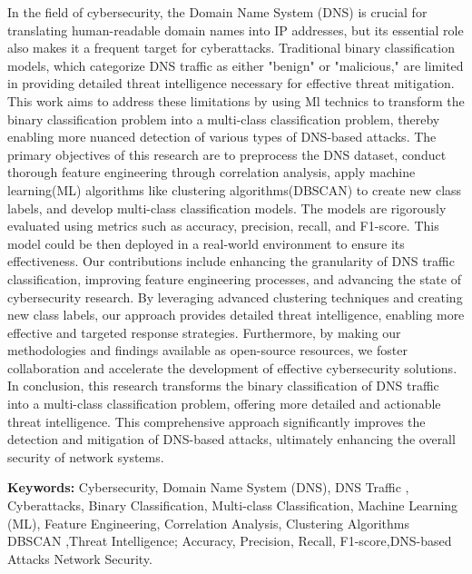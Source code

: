 \let\oldprintchaptertitle=\printchaptertitle
\renewcommand{\printchaptertitle}[1]{%
	\vspace*{-75pt}
	\oldprintchaptertitle{#1}
}%
\let\printchaptertitle=\oldprintchaptertitle


In the field of cybersecurity, the Domain Name System (DNS) is crucial for translating human-readable domain names into IP addresses, but its essential role also makes it a frequent target for cyberattacks. Traditional binary classification models, which categorize DNS traffic as either "benign" or "malicious," are limited in providing detailed threat intelligence necessary for effective threat mitigation. This work aims to address these limitations by using Ml technics to transform the binary classification problem into a multi-class classification problem, thereby enabling more nuanced detection of various types of DNS-based attacks.
The primary objectives of this research are to preprocess the DNS dataset, conduct thorough feature engineering through correlation analysis, apply machine learning(ML) algorithms like clustering algorithms(DBSCAN) to create new class labels, and develop multi-class classification models. The models are rigorously evaluated using metrics such as accuracy, precision, recall, and F1-score. This model could be then deployed in a real-world environment to ensure its effectiveness.
Our contributions include enhancing the granularity of DNS traffic classification, improving feature engineering processes, and advancing the state of cybersecurity research. By leveraging advanced clustering techniques and creating new class labels, our approach provides detailed threat intelligence, enabling more effective and targeted response strategies. Furthermore, by making our methodologies and findings available as open-source resources, we foster collaboration and accelerate the development of effective cybersecurity solutions.
In conclusion, this research transforms the binary classification of DNS traffic into a multi-class classification problem, offering more detailed and actionable threat intelligence. This comprehensive approach significantly improves the detection and mitigation of DNS-based attacks, ultimately enhancing the overall security of network systems.

\vspace{1cm}
\noindent\textbf{Keywords:} Cybersecurity, Domain Name System (DNS), DNS Traffic , Cyberattacks, Binary Classification, Multi-class Classification, Machine Learning (ML), Feature Engineering, Correlation Analysis, Clustering Algorithms DBSCAN ,Threat Intelligence; Accuracy, Precision, Recall, F1-score,DNS-based Attacks Network Security.
\myCleanStarChapterEnd
